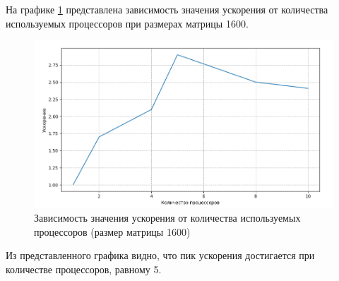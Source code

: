 \documentclass[12pt, a4paper]{article}
\begin{document}
На графике \ref{img:second} представлена зависимость значения ускорения от количества используемых процессоров при размерах матрицы 1600.

\begin{figure}[H]
	\centering
	\includegraphics[width=\textwidth]{img/snd.png}
	\caption{ Зависимость значения ускорения от количества используемых процессоров (размер матрицы 1600)}
	\label{img:second}
\end{figure}

Из представленного графика видно, что пик ускорения достигается при количестве процессоров, равному 5.
	
\end{document}
